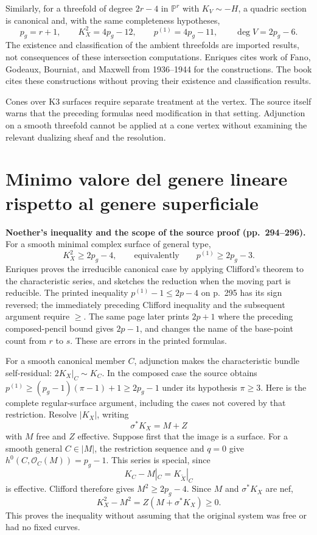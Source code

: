 Similarly, for a threefold of degree \(2r-4\) in \(\mathbb P^r\) with \(K_V\sim-H\), a quadric section is canonical and, with the same completeness hypotheses,
\[
p_g=r+1,\qquad K_X^2=4p_g-12,\qquad
p^{(1)}=4p_g-11,\qquad \deg V=2p_g-6.
\]
The existence and classification of the ambient threefolds are imported results, not consequences of these intersection computations. Enriques cites work of Fano, Godeaux, Bourniat, and Maxwell from 1936--1944 for the constructions. The book cites these constructions without proving their existence and classification results.

Cones over K3 surfaces require separate treatment at the vertex. The source itself warns that the preceding formulas need modification in that setting. Adjunction on a smooth threefold cannot be applied at a cone vertex without examining the relevant dualizing sheaf and the resolution.

\section{Minimo valore del genere lineare rispetto al genere superficiale}
\label{cp2-viii-11}

\textbf{Noether's inequality and the scope of the source proof (pp.~294--296).}
For a smooth minimal complex surface of general type,
\[
K_X^2\geq2p_g-4,
\qquad\text{equivalently}\qquad p^{(1)}\geq2p_g-3.
\]
Enriques proves the irreducible canonical case by applying Clifford's theorem to the characteristic series, and sketches the reduction when the moving part is reducible. The printed inequality \(p^{(1)}-1\leq2p-4\) on p.~295 has its sign reversed; the immediately preceding Clifford inequality and the subsequent argument require \(\geq\). The same page later prints \(2p+1\) where the preceding composed-pencil bound gives \(2p-1\), and changes the name of the base-point count from \(r\) to \(s\). These are errors in the printed formulas.

For a smooth canonical member \(C\), adjunction makes the characteristic bundle self-residual: \(2K_X|_C\sim K_C\). In the composed case the source obtains \(p^{(1)}\geq(p_g-1)(\pi-1)+1\geq2p_g-1\) under its hypothesis \(\pi\geq3\). Here is the complete regular-surface argument, including the cases not covered by that restriction. Resolve \(|K_X|\), writing
\[
\sigma^*K_X=M+Z
\]
with \(M\) free and \(Z\) effective. Suppose first that the image is a surface. For a smooth general \(C\in|M|\), the restriction sequence and \(q=0\) give \(h^0(C,\mathcal O_C(M))=p_g-1\). This series is special, since
\[
K_C-M|_C=K_{\widetilde X}|_C
\]
is effective. Clifford therefore gives \(M^2\geq2p_g-4\). Since \(M\) and \(\sigma^*K_X\) are nef,
\[
K_X^2-M^2=Z(M+\sigma^*K_X)\geq0.
\]
This proves the inequality without assuming that the original system was free or had no fixed curves.

